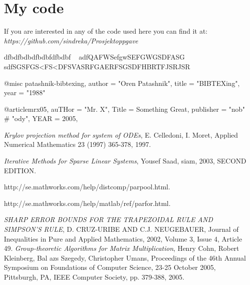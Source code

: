 \chapter*{My code}%

If you are interested in any of the code used here you can find it at: \\
\emph{https://github.com/sindreka/Prosjektoppgave}



dfbdfbdbdfbdbfdfbdbf ~\cite{patashnik-bibtexing} adfQAFWSefgwSEFGWGSDFASG ~\cite{mrx05} sdfSGSFGS<FS<DFSVASRFGAERFSGSDFHBRTFJSRJSR

@misc{ patashnik-bibtexing,
       author = "Oren Patashnik",
       title = "BIBTEXing",
       year = "1988" }
       
       @article{mrx05, 
auTHor = "Mr. X", 
Title = {Something Great}, 
publisher = "nob" # "ody", 
YEAR = 2005, 
} 


\begin{thebibliography}{9}


		\emph{Krylov projection method for system of ODEs},
		E. Celledoni, I. Moret,
		Applied Numerical Mathematics 23 (1997) 365-378,
		1997.
		
		\emph{Iterative Methods for Sparse Linear Systems},
		Yousef Saad,
		siam,
		2003,
		SECOND EDITION.

  		http://se.mathworks.com/help/distcomp/parpool.html.
  
  		http://se.mathworks.com/help/matlab/ref/parfor.html.
  
		\emph{SHARP ERROR BOUNDS FOR THE TRAPEZOIDAL RULE AND SIMPSON’S RULE},
		D. CRUZ-URIBE AND C.J. NEUGEBAUER,
		Journal of Inequalities in Pure and Applied Mathematics,
		2002,
		Volume 3, Issue 4, Article 49.
		\emph{Group-theoretic Algorithms for Matrix Multiplication},
		Henry Cohn, Robert Kleinberg, Bal azs Szegedy, Christopher Umans,
		Proceedings of the 46th Annual Symposium on Foundations of Computer Science, 23-25 October 2005, Pittsburgh, PA, IEEE Computer Society, pp. 379-388,
		2005.
\end{thebibliography}

